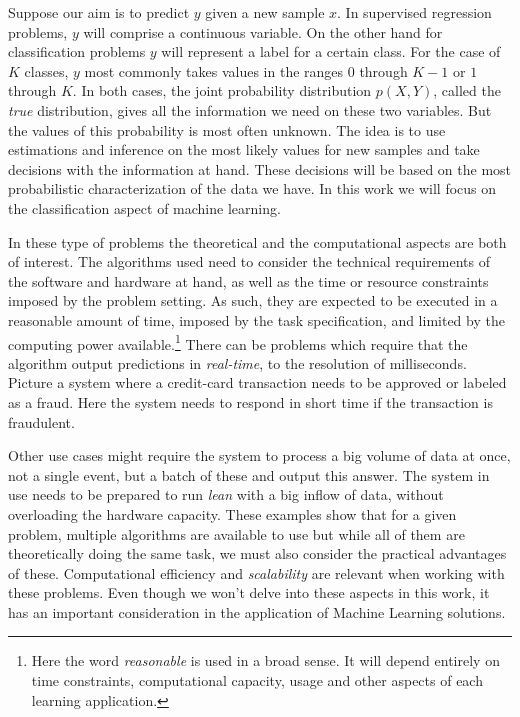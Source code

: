 Suppose our aim is to predict $y$ given a new sample $x$. In supervised regression problems, $y$ will comprise a continuous variable. On the other hand for classification problems $y$ will represent a label for a certain class. For the case of $K$ classes, $y$ most commonly takes values in the ranges $0$ through $K-1$ or $1$ through $K$. In both cases, the joint probability distribution $p(X, Y)$, called the \textit{true} distribution, gives all the information we need on these two variables. But the values of this probability is most often unknown. The idea is to use estimations and inference on the most likely values for new samples and take decisions with the information at hand. These decisions will be based on the most probabilistic characterization of the data we have. In this work we will focus on the classification aspect of machine learning.

In these type of problems the theoretical and the computational aspects are both of interest. The algorithms used need to consider the technical requirements of the software and hardware at hand, as well as the time or resource constraints imposed by the problem setting. As such, they are expected to be executed in a reasonable amount of time, imposed by the task specification, and limited by the computing power available.\footnote{Here the word \textit{reasonable} is used in a broad sense. It will depend entirely on time constraints, computational capacity, usage and other aspects of each learning application.} There can be problems which require that the algorithm output predictions in \textit{real-time}, to the resolution of milliseconds. Picture a system where a credit-card transaction needs to be approved or labeled as a fraud. Here the system needs to respond in short time if the transaction is fraudulent.

Other use cases might require the system to process a big volume of data at once, not a single event, but a batch of these and output this answer. The system in use needs to be prepared to run \textit{lean} with a big inflow of data, without overloading the hardware capacity. These examples show that for a given problem, multiple algorithms are available to use but while all of them are theoretically doing the same task, we must also consider the practical advantages of these. Computational efficiency and \textit{scalability} are relevant when working with these problems. Even though we won't delve into these aspects in this work, it has an important consideration in the application of Machine Learning solutions.


